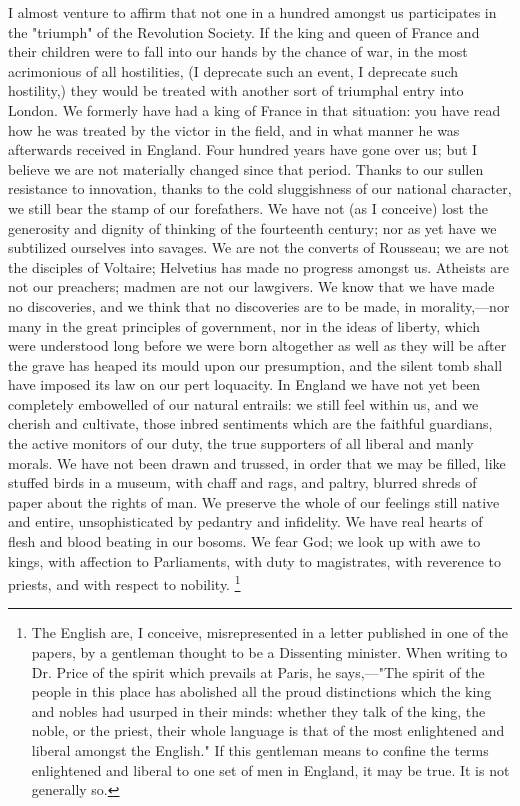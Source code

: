 I almost venture to affirm that not one in a hundred amongst us participates in the "triumph" of the Revolution Society. If the king and queen of France and their children were to fall into our hands by the chance of war, in the most acrimonious of all hostilities, (I deprecate such an event, I deprecate such hostility,) they would be treated with another sort of triumphal entry into London. We formerly have had a king of France in that situation: you have read how he was treated by the victor in the field, and in what manner he was afterwards received in England. Four hundred years have gone over us; but I believe we are not materially changed since that period. Thanks to our sullen resistance to innovation, thanks to the cold sluggishness of our national character, we still bear the stamp of our forefathers. We have not (as I conceive) lost the generosity and dignity of thinking of the fourteenth century; nor as yet have we subtilized ourselves into savages. We are not the converts of Rousseau; we are not the disciples of Voltaire; Helvetius has made no progress amongst us. Atheists are not our preachers; madmen are not our lawgivers. We know that we have made no discoveries, and we think that no discoveries are to be made, in morality,—nor many in the great principles of government, nor in the ideas of liberty, which were understood long before we were born altogether as well as they will be after the grave has heaped its mould upon our presumption, and the silent tomb shall have imposed its law on our pert loquacity. In England we have not yet been completely embowelled of our natural entrails: we still feel within us, and we cherish and cultivate, those inbred sentiments which are the faithful guardians, the active monitors of our duty, the true supporters of all liberal and manly morals. We have not been drawn and trussed, in order that we may be filled, like stuffed birds in a museum, with chaff and rags, and paltry, blurred shreds of paper about the rights of man. We preserve the whole of our feelings still native and entire, unsophisticated by pedantry and infidelity. We have real hearts of flesh and blood beating in our bosoms. We fear God; we look up with awe to kings, with affection to Parliaments, with duty to magistrates, with reverence to priests, and with respect to nobility.
\footnote{ The English are, I conceive, misrepresented in a letter published in one of the papers, by a gentleman thought to be a Dissenting minister. When writing to Dr. Price of the spirit which prevails at Paris, he says,—"The spirit of the people in this place has abolished all the proud distinctions which the king and nobles had usurped in their minds: whether they talk of the king, the noble, or the priest, their whole language is that of the most enlightened and liberal amongst the English." If this gentleman means to confine the terms enlightened and liberal to one set of men in England, it may be true. It is not generally so.}
